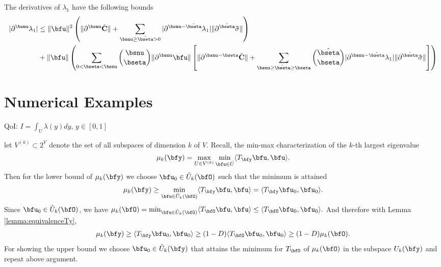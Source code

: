 \begin{lemma}
    The derivatives of $\lambda_1$ have the following bounds
    \begin{align}
        \vert \partial^{\bsnu} \lambda_1  \vert &
        \leq  \| \bfu \|^2 \left( \| \partial^{\bsnu} \tilde{\mathbf{C}}\| + \sum_{\bsnu \geq \hat{\bseta} > 0 } \vert \partial^{\bsnu  - \hat{\bseta}} \lambda_1 \vert \|  \partial^{\hat{\bseta}} \mathbf{\tilde{\sigma}}\| \right) \\
        &+ \| \bfu  \| \left( \sum_{0 < \bseta < \bsnu}  \binom{\bsnu}{\bseta} \|\partial^{\bsnu} \bfu \|  \left[ \| \partial^{\bsnu-\bseta} \tilde{\mathbf{C}}\|+ \sum_{\bsnu \geq \hat{\bseta} \geq \bseta } \binom{\hat{\bseta}}{\bseta} \vert \partial^{\bsnu  - \hat{\bseta}} \lambda_1 \vert \|  \partial^{\hat{\bseta}} \mathbf{\tilde{\sigma}}\|\right]  
        \right)
    \end{align} 
\end{lemma}
    
\section{Numerical Examples}

QoI: $I=\int_U \lambda (y) dy$, $y\in[0,1]$




let $V^{(k)} \subset 2^V$ denote the set of all subspaces of dimension $k$ of $V$.
    Recall, the min-max characterization of the $k$-th largest eigenvalue
    \begin{align*}
        \mu_k(\bfy) = \max_{U \in V^{(k)}} \min_{\bfu \in \hat U} \langle T_{\bfy} \bfu ,\bfu \rangle.
    \end{align*}
    Then for the lower bound of $\mu_k(\bfy) $ we choose $\bfu_0 \in \hat U_k(\bfO)$ such that the minimum is attained
    \begin{align*}
        \mu_k(\bfy) \geq \min_{ \bfu \in \hat U_{k} (\bfO)} \langle T_{\bfy} \bfu ,\bfu \rangle = \langle T_{\bfy} \bfu_0 ,\bfu_0 \rangle.
    \end{align*}
    Since $\bfu_0 \in \hat U_k (\bfO)$, we have $ \mu_k(\bfO) =  \min_{ \bfu \in \hat U_{k} (\bfO)} \langle T_{\bfO} \bfu ,\bfu \rangle \leq \langle T_{\bfO} \bfu_0,\bfu_0 \rangle. $  And therefore with Lemma \ref{lemma:equivalenceTy},
    \begin{align*}
        \mu_k(\bfy) \geq  \langle T_{\bfy} \bfu_0, \bfu_0 \rangle \geq (1-D) \langle T_{\bfO} \bfu_0 , \bfu_0 \rangle \geq (1-D) \mu_k(\bfO).
    \end{align*}
    For showing the upper bound we choose $\bfu_0 \in \hat U_k(\bfy)$ that attains the minimum for $T_{\bfO}$ of $\mu_k(\bfO)$ in the subspace $U_k(\bfy)$ and repeat above argument.






